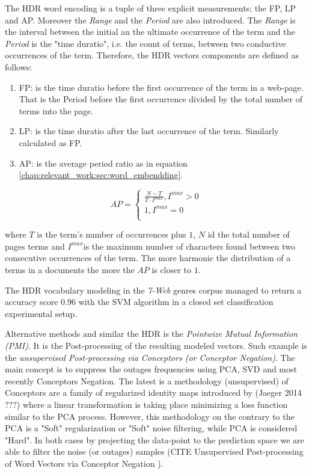The HDR word encoding is a tuple of three explicit measurements; the FP, LP and AP. Moreover the \textit{Range} and the \textit{Period} are also introduced. The \textit{Range} is the interval between the initial an the ultimate occurrence of the term and the \textit{Period} is the "time duratio", i.e. the count of terms, between two conductive occurrences of the term. Therefore, the HDR vectors components are defined as follows:

\begin{enumerate}
\item FP: is the time duratio before the first occurrence of the term in a web-page. That is the Period before the first occurrence divided by the total number of terms into the page.
\item LP: is the time duratio after the last occurrence of the term. Similarly calculated as FP.
\item AP: is the average period ratio as in equation \ref{chap:relevant_work:sec:word_embendding}.
\end{enumerate}

\begin{equation}\label{chap:relevant_work:sec:word_embendding}
	AP  =
      \begin{cases}
        \frac{N - T}{T \cdot I^{max}}, I^{max} > 0  \\
        1, I^{max} = 0 \\ 
       \end{cases}
\end{equation}

\noindent
where $T$ is the term's number of occurrences plus $1$, $N$ id the total number of pages terms and $I^{max}$is the maximum number of characters found between two consecutive occurrences of the term. The more harmonic the distribution of a terms in a documents the more the $AP$ is closer to $1$.

The HDR vocabulary modeling in the \textit{7-Web} genres corpus managed to return a accuracy score $0.96$ with the SVM algorithm in a closed set classification experimental setup.

Alternative methods and similar the HDR is the \textit{Pointwize Mutual Information (PMI)}. It is the Post-processing of the resulting modeled vectors. Such example is the \textit{unsupervised Post-processing via Conceptors (or Conceptor Negation)}. The main concept is to suppress the outages frequencies using PCA, SVD and most recently Conceptors Negation. The latest is a methodology (unsupervised) of Conceptors are a family of regularized identity maps introduced by (Jaeger 2014 ???) where a linear transformation is taking place minimizing a loss function similar to the PCA process. However, this methodology on the contrary to the PCA is a "Soft" regularization or "Soft" noise filtering, while PCA is considered "Hard". In both cases by projecting the data-point to the prediction space we are able to filter the noise (or outages) samples (CITE Unsupervised Post-processing of Word Vectors via Conceptor Negation ).

